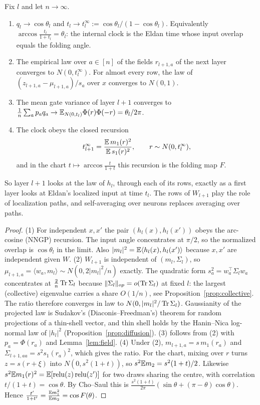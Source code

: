 \begin{theorem}\label{thm:selfloc}
Fix $l$ and let $n\to\infty$.
\begin{enumerate}[leftmargin=*]
\item $q_l\to\cos\theta_l$ and $t_l\to t_l^\infty:=\cos\theta_l/(1-\cos\theta_l)$. Equivalently $\arccos\frac{t_l}{1+t_l}=\theta_l$: the internal clock is the Eldan
time whose input overlap equals the folding angle.
\item The empirical law over $a\in[n]$ of the fields $r_{l+1,a}$ of the next layer converges to $N(0,t_l^\infty)$. For almost every row, the
law of $(z_{l+1,a}-\mu_{l+1,a})/s_a$ over $x$ converges to $N(0,1)$.
\item The mean gate variance of layer $l+1$ converges to $\frac1n\sum_ap_a q_a\to\mathbb E_{N(0,t_l)}\Phi(r)\Phi(-r)=\theta_l/2\pi$.
\item The clock obeys the closed recursion
\[
t_{l+1}^\infty=\frac{\mathbb E\,m_1(r)^2}{\mathbb E\,s_1(r)^2},\qquad r\sim N(0,t_l^\infty),
\]
and in the chart $t\mapsto\arccos\frac t{1+t}$ this recursion is the folding map $F$.
\end{enumerate}
So layer $l+1$ looks at the law of $h_l$, through each of its rows, exactly as a first layer looks at Eldan's localized input at time
$t_l$. The rows of $W_{l+1}$ play the role of localization paths, and self-averaging over neurons replaces averaging over paths.
\end{theorem}
\begin{proof}
(1) For independent $x,x'$ the pair $(h_l(x),h_l(x'))$ obeys the arc-cosine (NNGP) recursion. The input angle concentrates at $\pi/2$, so
the normalized overlap is $\cos\theta_l$ in the limit. Also $|m_l|^2=\mathbb E\langle h_l(x),h_l(x')\rangle$ because $x,x'$ are independent given
$W$.
(2) $W_{l+1}$ is independent of $(m_l,\Sigma_l)$, so $\mu_{l+1,a}=\langle w_a,m_l\rangle\sim N(0,2|m_l|^2/n)$ exactly. The quadratic form
$s_a^2=w_a^{\top}\Sigma_lw_a$ concentrates at $\frac2n\operatorname{Tr}\Sigma_l$ because $\|\Sigma_l\|_{op}=o(\operatorname{Tr}\Sigma_l)$ at fixed $l$: the largest
(collective) eigenvalue carries a share $O(1/n)$, see Proposition~\ref{prop:collective}. The ratio therefore converges in law to
$N(0,|m_l|^2/\operatorname{Tr}\Sigma_l)$. Gaussianity of the projected law is Sudakov's (Diaconis--Freedman's) theorem for random projections of a
thin-shell vector, and thin shell holds by the Hanin--Nica log-normal law of $|h_l|^2$ (Proposition~\ref{prop:diffusion}).
(3) follows from (2) with $p_a=\Phi(r_a)$ and Lemma~\ref{lem:field}.
(4) Under (2), $m_{l+1,a}=s\,m_1(r_a)$ and $\Sigma_{l+1,aa}=s^2s_1(r_a)^2$, which gives the ratio. For the chart, mixing over $r$ turns
$z=s(r+\xi)$ into $N(0,s^2(1+t))$, so $s^2\mathbb E m_2=s^2(1+t)/2$. Likewise $s^2\mathbb E m_1(r)^2=\mathbb E[\operatorname{relu}(z)\operatorname{relu}(z')]$ for two draws sharing
the centre, with correlation $t/(1+t)=\cos\theta$. By Cho--Saul this is $\frac{s^2(1+t)}{2\pi}(\sin\theta+(\pi-\theta)\cos\theta)$. Hence
$\frac{t'}{1+t'}=\frac{\mathbb E m_1^2}{\mathbb E m_2}=\cos F(\theta)$.
\end{proof}

